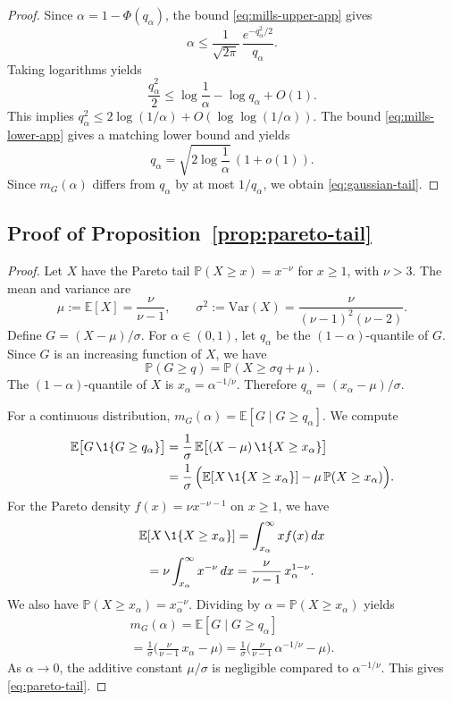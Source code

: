 \documentclass[twocolumn]{scholar7}
\newcommand{\E}{\mathbb{E}}
\newcommand{\Prob}{\mathbb{P}}
\begin{document}
\begin{appendix}
\begin{proof}
Since $\alpha=1-\Phi(q_\alpha)$, the bound \eqref{eq:mills-upper-app} gives
\[
\alpha\le \frac{1}{\sqrt{2\pi}}\,\frac{e^{-q_\alpha^2/2}}{q_\alpha}.
\]
Taking logarithms yields
\[
\frac{q_\alpha^2}{2}\le \log\frac{1}{\alpha} - \log q_\alpha + O(1).
\]
This implies $q_\alpha^2\le 2\log(1/\alpha)+O(\log\log(1/\alpha))$.
The bound \eqref{eq:mills-lower-app} gives a matching lower bound and yields
\[
q_\alpha=\sqrt{2\log\frac{1}{\alpha}}\,(1+o(1)).
\]
Since $m_G(\alpha)$ differs from $q_\alpha$ by at most $1/q_\alpha$, we obtain \eqref{eq:gaussian-tail}.
\end{proof}

\subsection{Proof of Proposition~\ref{prop:pareto-tail}}
\begin{proof}
Let $X$ have the Pareto tail $\Prob(X\ge x)=x^{-\nu}$ for $x\ge 1$, with $\nu>3$.
The mean and variance are
\[
\mu:=\E[X]=\frac{\nu}{\nu-1},
\qquad
\sigma^2:=\mathrm{Var}(X)=\frac{\nu}{(\nu-1)^2(\nu-2)}.
\]
Define $G=(X-\mu)/\sigma$.
For $\alpha\in(0,1)$, let $q_\alpha$ be the $(1-\alpha)$-quantile of $G$.
Since $G$ is an increasing function of $X$, we have
\[
\Prob(G\ge q)=\Prob(X\ge \sigma q+\mu).
\]
The $(1-\alpha)$-quantile of $X$ is $x_\alpha=\alpha^{-1/\nu}$.
Therefore $q_\alpha=(x_\alpha-\mu)/\sigma$.

For a continuous distribution, $m_G(\alpha)=\E[G\mid G\ge q_\alpha]$.
We compute
\begin{align*}
\E\big[G\,\1\{G\ge q_\alpha\}\big]
&=
\frac{1}{\sigma}\,\E\big[(X-\mu)\,\1\{X\ge x_\alpha\}\big] \\
&=
\frac{1}{\sigma}\,\Big(\E[X\,\1\{X\ge x_\alpha\}] - \mu\,\Prob(X\ge x_\alpha)\Big).
\end{align*}
For the Pareto density $f(x)=\nu x^{-\nu-1}$ on $x\ge 1$, we have
\begin{multline*}
\E[X\,\1\{X\ge x_\alpha\}]
=
\int_{x_\alpha}^{\infty} x f(x)\,dx \\
=
\nu\int_{x_\alpha}^{\infty} x^{-\nu}\,dx
=
\frac{\nu}{\nu-1}\,x_\alpha^{1-\nu}.
\end{multline*}
We also have $\Prob(X\ge x_\alpha)=x_\alpha^{-\nu}$.
Dividing by $\alpha=\Prob(X\ge x_\alpha)$ yields
\begin{multline*}
m_G(\alpha)
=
\E[G\mid G\ge q_\alpha] \\
=
\frac{1}{\sigma}\Big(\frac{\nu}{\nu-1}\,x_\alpha-\mu\Big)
=
\frac{1}{\sigma}\Big(\frac{\nu}{\nu-1}\,\alpha^{-1/\nu}-\mu\Big).
\end{multline*}
As $\alpha\to 0$, the additive constant $\mu/\sigma$ is negligible compared to $\alpha^{-1/\nu}$.
This gives \eqref{eq:pareto-tail}.
\end{proof}


\end{appendix}
\end{document}
